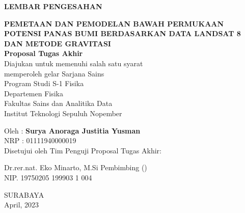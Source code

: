 \newpage
\thispagestyle{empty}
\begin{center}
	\textbf{LEMBAR PENGESAHAN}\\
	\vskip30pt
	
	\textbf{PEMETAAN DAN PEMODELAN BAWAH PERMUKAAN POTENSI PANAS BUMI BERDASARKAN DATA LANDSAT 8 DAN METODE GRAVITASI}\\
	
	\vskip30pt
	\textbf{Proposal Tugas Akhir}\\
	\doublespacing
	Diajukan untuk memenuhi salah satu syarat\\
	memperoleh gelar Sarjana Sains\\
	Program Studi S-1 Fisika\\
	Departemen Fisika\\
	Fakultas Sains dan Analitika Data\\
	Institut Teknologi Sepuluh Nopember\\
	\vskip 20pt
	
	Oleh : \textbf{Surya Anoraga Justitia Yusman}\\
	NRP : 01111940000019\\
	
	\vskip 50pt
	Disetujui oleh Tim Penguji Proposal Tugas Akhir:
\end{center}
		\vskip 35pt
		Dr.rer.nat. Eko Minarto, M.Si \hfill Pembimbing \hfill (\dotfill)\\
		NIP. 19750205 199903 1 004
\begin{center}
	\vfill
	SURABAYA\\
	April, 2023
\end{center}

\restoregeometry
